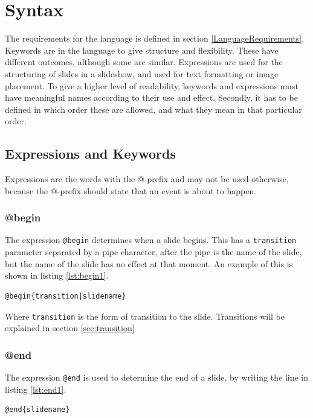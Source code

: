 \chapter{Syntax}
\label{SSyntax}

The requirements for the language is defined in section \ref{LanguageRequirements}. Keywords are in the language to give structure and flexibility. These have different outcomes, although some are similar. Expressions are used for the structuring of slides in a slideshow, and used for text formatting or image placement. To give a higher level of readability, keywords and expressions must have meaningful names according to their use and effect. Secondly, it has to be defined in which order these are allowed, and what they mean in that particular order.

\section{Expressions and Keywords}
Expressions are the words with the @-prefix and may not be used otherwise, because the @-prefix should state that an event is about to happen.

\subsection{@begin}
\label{@begin}
The expression \lstinline!@begin! determines when a slide begins. This has a \texttt{transition} parameter separated by a pipe character, after the pipe is the name of the slide, but the name of the slide has no effect at that moment. An example of this is shown in listing \ref{lst:begin1}.
\begin{lstlisting}[frame=single, caption=Generic \texttt{begin} expression example, label=lst:begin1]
@begin{transition|slidename}
\end{lstlisting}
Where \texttt{transition} is the form of transition to the slide. Transitions will be explained in section \ref{sec:transition}

\subsection{@end}
\label{@end}
The expression \lstinline!@end! is used to determine the end of a slide, by writing the line in listing \ref{lst:end1}.
\begin{lstlisting}[frame=single, caption="Generic \texttt{end} expression example, label=lst:end1]
@end{slidename}
\end{lstlisting}

